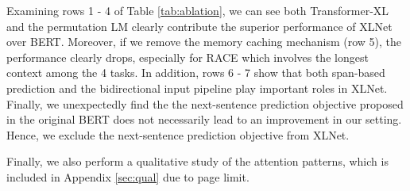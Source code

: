 Examining rows 1 - 4 of Table \ref{tab:ablation}, we can see both Transformer-XL and the permutation LM clearly contribute the superior performance of XLNet over BERT.
Moreover, if we remove the memory caching mechanism (row 5), the performance clearly drops, especially for RACE which involves the longest context among the 4 tasks.
In addition, rows 6 - 7 show that both span-based prediction and the bidirectional input pipeline play important roles in XLNet.
Finally, we unexpectedly find the the next-sentence prediction objective proposed in the original BERT does not necessarily lead to an improvement in our setting.
Hence, we exclude the next-sentence prediction objective from XLNet.

Finally, we also perform a qualitative study of the attention patterns, which is included in Appendix \ref{sec:qual} due to page limit.


